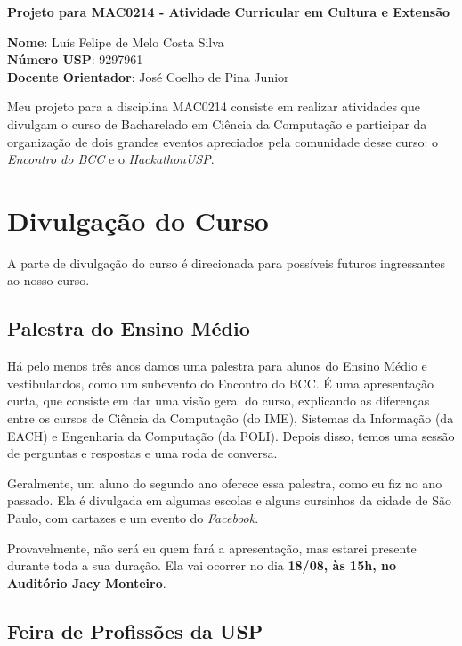 \documentclass[12pt,letterpaper]{article}
\begin{document}
	
	\begin{center}
		\LARGE \bf
		Projeto para MAC0214 - Atividade Curricular em Cultura e Extensão
	\end{center}
	
	\large \textbf{Nome}: Luís Felipe de Melo Costa Silva \\
	\textbf{Número USP}: 9297961 \\
	\large \textbf{Docente Orientador}: José Coelho de Pina Junior
	
	Meu projeto para a disciplina MAC0214 consiste em realizar atividades que divulgam o curso de Bacharelado em Ciência da Computação e participar da organização de dois grandes eventos apreciados pela comunidade desse curso: o \textit{Encontro do BCC} e o \textit{HackathonUSP}.
	
	\section{Divulgação do Curso}
	
	A parte de divulgação do curso é direcionada para possíveis futuros ingressantes ao nosso curso.
	
	\subsection{Palestra do Ensino Médio}
	
	Há pelo menos três anos damos uma palestra para alunos do Ensino Médio e vestibulandos, como um subevento do Encontro do BCC. É uma apresentação curta, que consiste em dar uma visão geral do curso, explicando as diferenças entre os cursos de Ciência da Computação (do IME), Sistemas da Informação (da EACH) e Engenharia da Computação (da POLI). Depois disso, temos uma sessão de perguntas e respostas e uma roda de conversa. 
	
	Geralmente, um aluno do segundo ano oferece essa palestra, como eu fiz no ano passado. Ela é divulgada em algumas escolas e alguns cursinhos da cidade de São Paulo, com cartazes e um evento do \textit{Facebook}.
	
	Provavelmente, não será eu quem fará a apresentação, mas estarei presente durante toda a sua duração. Ela vai ocorrer no dia \textbf{18/08, às 15h, no Auditório Jacy Monteiro}.
	
	\subsection{Feira de Profissões da USP}
	
\end{document}
